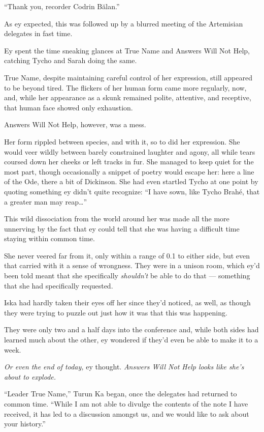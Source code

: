 ``Thank you, recorder Codrin Bălan.''

As ey expected, this was followed up by a blurred meeting of the Artemisian delegates in fast time.

Ey spent the time sneaking glances at True Name and Answers Will Not Help, catching Tycho and Sarah doing the same.

True Name, despite maintaining careful control of her expression, still appeared to be beyond tired. The flickers of her human form came more regularly, now, and, while her appearance as a skunk remained polite, attentive, and receptive, that human face showed only exhaustion.

Answers Will Not Help, however, was a mess.

Her form rippled between species, and with it, so to did her expression. She would veer wildly between barely constrained laughter and agony, all while tears coursed down her cheeks or left tracks in fur. She managed to keep quiet for the most part, though occasionally a snippet of poetry would escape her: here a line of the Ode, there a bit of Dickinson. She had even startled Tycho at one point by quoting something ey didn't quite recognize: ``I have sown, like Tycho Brahé, that a greater man may reap\ldots{}''

This wild dissociation from the world around her was made all the more unnerving by the fact that ey could tell that she was having a difficult time staying within common time.

She never veered far from it, only within a range of 0.1 to either side, but even that carried with it a sense of wrongness. They were in a unison room, which ey'd been told meant that she specifically \emph{shouldn't} be able to do that — something that she had specifically requested.

Iska had hardly taken their eyes off her since they'd noticed, as well, as though they were trying to puzzle out just how it was that this was happening.

They were only two and a half days into the conference and, while both sides had learned much about the other, ey wondered if they'd even be able to make it to a week.

\emph{Or even the end of today,} ey thought. \emph{Answers Will Not Help looks like she's about to explode.}

``Leader True Name,'' Turun Ka began, once the delegates had returned to common time. ``While I am not able to divulge the contents of the note I have received, it has led to a discussion amongst us, and we would like to ask about your history.''

